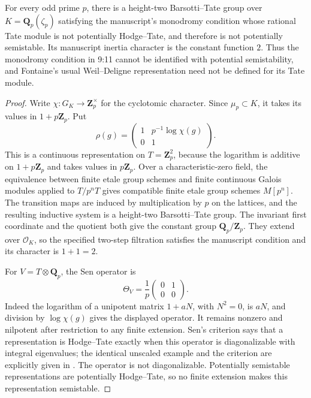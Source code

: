 \begin{proposition}\label{prop:B-RD4}
For every odd prime $p$, there is a height-two Barsotti--Tate group over
$K=\mathbf Q_p(\zeta_p)$ satisfying the manuscript's monodromy condition
whose rational Tate module is not potentially Hodge--Tate, and therefore
is not potentially semistable. Its manuscript inertia character is the
constant function $2$. Thus the monodromy condition in 9:11 cannot be
identified with potential semistability, and Fontaine's usual
Weil--Deligne representation need not be defined for its Tate module.
\end{proposition}
\begin{proof}
Write $\chi:G_K\to\mathbf Z_p^\times$ for the cyclotomic character.
Since $\mu_p\subset K$, it takes its values in $1+p\mathbf Z_p$. Put
\[
 \rho(g)=\begin{pmatrix}1&p^{-1}\log\chi(g)\\0&1\end{pmatrix}.
\]
This is a continuous representation on $T=\mathbf Z_p^2$, because the
logarithm is additive on $1+p\mathbf Z_p$ and takes values in
$p\mathbf Z_p$. Over a characteristic-zero field, the equivalence
between finite etale group schemes and finite continuous Galois modules
applied to $T/p^nT$ gives compatible finite etale group schemes $M[p^n]$.
The transition maps are induced by multiplication by $p$ on the lattices,
and the resulting inductive system is a height-two Barsotti--Tate group.
The invariant first coordinate and the quotient both give the constant
group $\mathbf Q_p/\mathbf Z_p$. They extend over $\mathcal O_K$, so the
specified two-step filtration satisfies the manuscript condition and
its character is $1+1=2$.

For $V=T\otimes\mathbf Q_p$, the Sen operator is
\[
 \Theta_V=\frac1p\begin{pmatrix}0&1\\0&0\end{pmatrix}.
\]
Indeed the logarithm of a unipotent matrix $1+aN$, with $N^2=0$, is
$aN$, and division by $\log\chi(g)$ gives the displayed operator.
It remains nonzero and nilpotent after restriction to any finite
extension. Sen's criterion says that a representation is Hodge--Tate
exactly when this operator is diagonalizable with integral eigenvalues;
the identical unscaled example and the criterion are explicitly given
in \cite[\S II.1.2, p.~9 of the author's version]{Berger2004Introduction}.
The operator is not diagonalizable. Potentially semistable
representations are potentially Hodge--Tate, so no finite extension
makes this representation semistable.
\end{proof}

